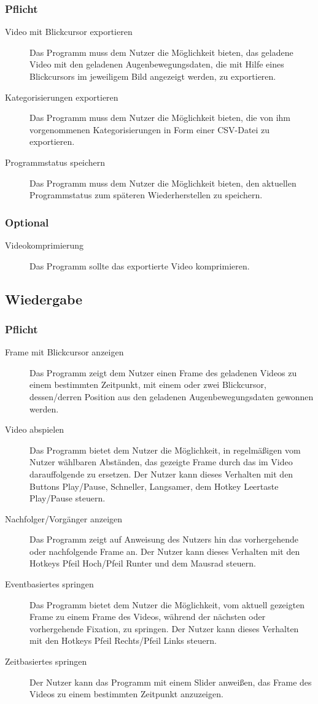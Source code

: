 \documentclass[a4paper,draft]{scrartcl}
\begin{document}
\subsubsection{Pflicht}
\begin{description}
\item[Video mit Blickcursor exportieren] Das Programm muss dem Nutzer die Möglichkeit bieten, das geladene Video mit den geladenen Augenbewegungsdaten, die mit Hilfe eines Blickcursors im jeweiligem Bild angezeigt werden, zu exportieren.
\item[Kategorisierungen exportieren] Das Programm muss dem Nutzer die Möglichkeit bieten, die von ihm vorgenommenen Kategorisierungen in Form einer CSV-Datei zu exportieren.
\item[Programmstatus speichern] Das Programm muss dem Nutzer die Möglichkeit bieten, den aktuellen Programmstatus zum späteren Wiederherstellen zu speichern.
\end{description}
\subsubsection{Optional}
\begin{description}
\item[Videokomprimierung] Das Programm sollte das exportierte Video komprimieren. 
\end{description}
\subsection{Wiedergabe}
\subsubsection{Pflicht}
\begin{description}
\item[Frame mit Blickcursor anzeigen] Das Programm zeigt dem Nutzer einen Frame des geladenen Videos zu einem bestimmten Zeitpunkt, mit einem oder zwei Blickcursor, dessen/derren Position aus den geladenen Augenbewegungsdaten gewonnen werden.
\item[Video abspielen] Das Programm bietet dem Nutzer die Möglichkeit, in regelmäßigen vom Nutzer wählbaren Abständen, das gezeigte Frame durch das im Video darauffolgende zu ersetzen. Der Nutzer kann dieses Verhalten mit den Buttons Play/Pause, Schneller, Langsamer, dem Hotkey Leertaste Play/Pause steuern.
\item[Nachfolger/Vorgänger anzeigen] Das Programm zeigt auf Anweisung des Nutzers hin das vorhergehende oder nachfolgende Frame an. Der Nutzer kann dieses Verhalten mit den Hotkeys Pfeil Hoch/Pfeil Runter und dem Mausrad steuern.
\item[Eventbasiertes springen] Das Programm bietet dem Nutzer die Möglichkeit, vom aktuell gezeigten Frame zu einem Frame des Videos, während der nächsten oder vorhergehende Fixation, zu springen. Der Nutzer kann dieses Verhalten mit den Hotkeys Pfeil Rechts/Pfeil Links steuern.
\item[Zeitbasiertes springen] Der Nutzer kann das Programm mit einem Slider anweißen, das Frame des Videos zu einem bestimmten Zeitpunkt anzuzeigen.
\end{description}
\end{document}
